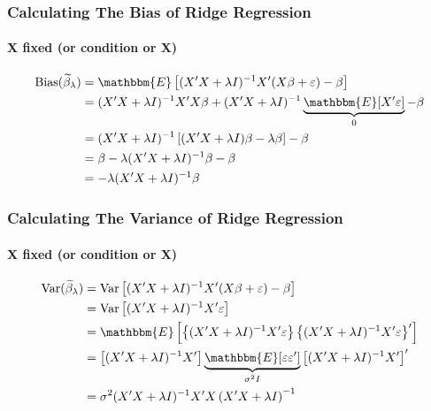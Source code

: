\begin{frame}
  \frametitle{Calculating The Bias of Ridge Regression}
  \framesubtitle{X fixed (or condition or X)}

  \begin{align*}
    \text{Bias}(\widetilde{\beta}_\lambda ) &= \mathbbm{E}\left[ (X'X + \lambda I)^{-1} X'(X\beta + \varepsilon) - \beta \right]\\
    &= (X'X + \lambda I)^{-1} X'X\beta  + (X'X + \lambda I)^{-1}\underbrace{\mathbbm{E}[X'\varepsilon]}_{0} - \beta\\
    &= (X'X + \lambda I)^{-1}\left[ (X'X + \lambda I)\beta - \lambda \beta \right] - \beta\\
    &= \beta - \lambda (X'X + \lambda I)^{-1} \beta - \beta\\
    &= - \lambda(X'X + \lambda I)^{-1} \beta
  \end{align*}

\end{frame}
\begin{frame}
  \frametitle{Calculating The Variance of Ridge Regression}
  \framesubtitle{X fixed (or condition or X)}

  \begin{align*}
    \text{Var}(\widetilde{\beta}_\lambda ) &= \text{Var}\left[ (X'X + \lambda I)^{-1} X'(X\beta + \varepsilon) - \beta \right]\\
    &= \text{Var}\left[ (X'X + \lambda I)^{-1}X' \varepsilon \right]\\
    &= \mathbbm{E}\left[ \left\{(X'X + \lambda I)^{-1}X' \varepsilon \right\}\left\{ (X'X + \lambda I)^{-1}X' \varepsilon \right\}'\right]\\
    &= \left[(X'X + \lambda I)^{-1} X'\right] \underbrace{\mathbbm{E}[\varepsilon \varepsilon']}_{\sigma^2 I} \left[(X'X + \lambda I)^{-1} X'\right]'\\
    &= \sigma^2 (X'X + \lambda I)^{-1} X'X \left( X'X + \lambda I \right)^{-1}
  \end{align*}

\end{frame}
